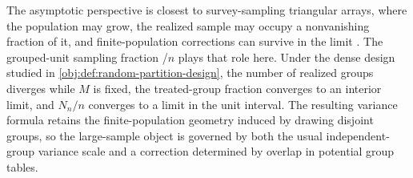 \documentclass[11pt]{article}
\begin{document}
The asymptotic perspective is closest to survey-sampling triangular arrays, where the population may grow, the realized sample may occupy a nonvanishing fraction of it, and finite-population corrections can survive in the limit \citep{Hajek1960,Cochran1977,Ohlsson1989,Fuller2009}. The grouped-unit sampling fraction /\(n\) plays that role here. Under the dense design studied in \cref{obj:def:random-partition-design}, the number of realized groups  diverges while \(M\) is fixed, the treated-group fraction  converges to an interior limit, and \(N_n/n\) converges to a limit  in the unit interval. The resulting variance formula retains the finite-population geometry induced by drawing disjoint groups, so the large-sample object is governed by both the usual independent-group variance scale and a correction determined by overlap in potential group tables.
\end{document}
